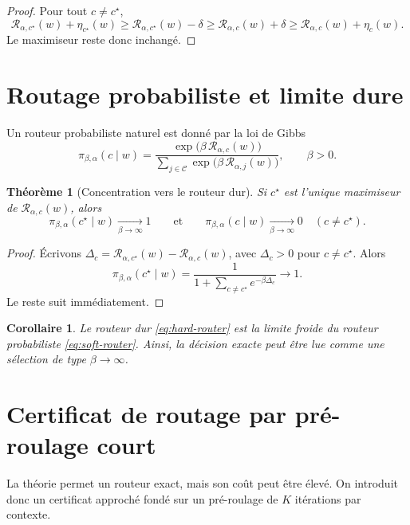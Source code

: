 \documentclass[11pt,a4paper]{article}
\newtheorem{theorem}{Théorème}[section]
\newtheorem{corollary}{Corollaire}[section]
\newcommand{\Ccal}{\mathcal C}
\begin{document}
\begin{proof}
Pour tout \(c\neq c^\star\),
\[
\mathcal R_{\alpha,c^\star}(w)+\eta_{c^\star}(w)
\ge
\mathcal R_{\alpha,c^\star}(w)-\delta
\ge
\mathcal R_{\alpha,c}(w)+\delta
\ge
\mathcal R_{\alpha,c}(w)+\eta_c(w).
\]
Le maximiseur reste donc inchangé.
\end{proof}

\section{Routage probabiliste et limite dure}

Un routeur probabiliste naturel est donné par la loi de Gibbs
\begin{equation}\label{eq:soft-router}
\pi_{\beta,\alpha}(c\mid w)
=
\frac{\exp\!\bigl(\beta\,\mathcal R_{\alpha,c}(w)\bigr)}
{\sum_{j\in\Ccal}\exp\!\bigl(\beta\,\mathcal R_{\alpha,j}(w)\bigr)},
\qquad \beta>0.
\end{equation}

\begin{theorem}[Concentration vers le routeur dur]
\label{thm:soft-to-hard}
Si \(c^\star\) est l'unique maximiseur de \(\mathcal R_{\alpha,c}(w)\), alors
\[
\pi_{\beta,\alpha}(c^\star\mid w)\xrightarrow[\beta\to\infty]{}1
\qquad\text{et}\qquad
\pi_{\beta,\alpha}(c\mid w)\xrightarrow[\beta\to\infty]{}0
\quad(c\neq c^\star).
\]
\end{theorem}

\begin{proof}
Écrivons \(\Delta_c=\mathcal R_{\alpha,c^\star}(w)-\mathcal R_{\alpha,c}(w)\), avec \(\Delta_c>0\) pour \(c\neq c^\star\).
Alors
\[
\pi_{\beta,\alpha}(c^\star\mid w)
=
\frac{1}{1+\sum_{c\neq c^\star}e^{-\beta\Delta_c}}
\to 1.
\]
Le reste suit immédiatement.
\end{proof}

\begin{corollary}
Le routeur dur \eqref{eq:hard-router} est la limite froide du routeur probabiliste \eqref{eq:soft-router}.
Ainsi, la décision exacte peut être lue comme une sélection de type \(\beta\to\infty\).
\end{corollary}

\section{Certificat de routage par pré-roulage court}

La théorie permet un routeur exact, mais son coût peut être élevé.
On introduit donc un certificat approché fondé sur un pré-roulage de \(K\) itérations par contexte.
\end{document}
